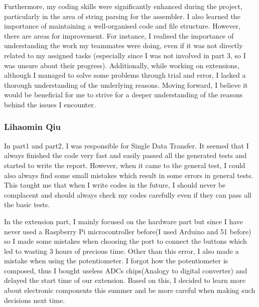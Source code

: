 \documentclass[11pt]{article}
\begin{document}
Furthermore, my coding skills were significantly enhanced during the project, particularly in the area of string parsing for the assembler. I also learned the importance of maintaining a well-organised code and file structure. However, there are areas for improvement. For instance, I realised the importance of understanding the work my teammates were doing, even if it was not directly related to my assigned tasks (especially since I was not involved in part 3, so I was unsure about their progress). Additionally, while working on extensions, although I managed to solve some problems through trial and error, I lacked a thorough understanding of the underlying reasons. Moving forward, I believe it would be beneficial for me to strive for a deeper understanding of the reasons behind the issues I encounter.

\subsubsection{Lihaomin Qiu}
In part1 and part2, I was responsible for Single Data Transfer. It seemed that I always finished the code very fast and easily passed all the generated tests and started to write the report. However, when it came to the general test, I could also always find some small mistakes which result in some errors in general tests. This taught me that when I write codes in the future, I should never be complacent and should always check my codes carefully even if they can pass all the basic tests.

In the extension part, I mainly focused on the hardware part but since I have never used a Raspberry Pi  microcontroller before(I used Arduino and 51 before) so I made some mistakes when choosing the port to connect the buttons which led to wasting 3 hours of precious time. Other than this error, I also made a mistake when using the potentiometer. I forgot how the potentiometer is composed, thus I bought useless ADCs chips(Analogy to digital converter) and delayed the start time of our extension. Based on this, I decided to learn more about electronic components this summer and be more careful when making such decisions next time.
\end{document}

